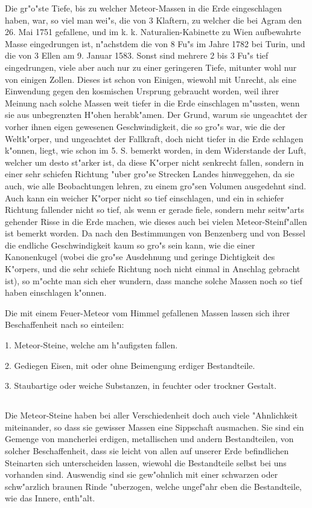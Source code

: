 \documentclass[a4paper, 11pt, oneside, polutonikogreek, german]{article}
\begin{document}
Die gr"o"ste Tiefe, bis zu welcher Meteor-Massen in die Erde eingeschlagen haben, war, so viel man wei"s, die von 3 Klaftern, zu welcher die bei Agram den 26. Mai 1751 gefallene, und im k. k. Naturalien-Kabinette zu Wien aufbewahrte Masse eingedrungen ist, n"achstdem die von 8 Fu"s im Jahre 1782 bei Turin, und die von 3 Ellen am 9. Januar 1583. Sonst sind mehrere 2 bis 3 Fu"s tief eingedrungen, viele aber auch nur zu einer geringeren Tiefe, mitunter wohl nur von einigen Zollen. Dieses ist schon von Einigen, wiewohl mit Unrecht, als eine Einwendung gegen den kosmischen Ursprung gebraucht worden, weil ihrer Meinung nach solche Massen weit tiefer in die Erde einschlagen m"ussten, wenn sie aus unbegrenzten H"ohen herabk"amen. Der Grund, warum sie ungeachtet der vorher ihnen eigen gewesenen Geschwindigkeit, die so gro"s war, wie die der Weltk"orper, und ungeachtet der Fallkraft, doch nicht tiefer in die Erde schlagen k"onnen, liegt, wie schon im 5. S. bemerkt worden, in dem Widerstande der Luft, welcher um desto st"arker ist, da diese K"orper nicht senkrecht fallen, sondern in einer sehr schiefen Richtung "uber gro"se Strecken Landes hinweggehen, da sie auch, wie alle Beobachtungen lehren, zu einem gro"sen Volumen ausgedehnt sind. Auch kann ein weicher K"orper nicht so tief einschlagen, und ein in schiefer Richtung fallender nicht so tief, als wenn er gerade fiele, sondern mehr seitw"arts gehender Risse in die Erde machen, wie dieses auch bei vielen Meteor-Steinf"allen ist bemerkt worden. Da nach den Bestimmungen von Benzenberg und von Bessel die endliche Geschwindigkeit kaum so gro"s sein kann, wie die einer Kanonenkugel (wobei die gro"se Ausdehnung und geringe Dichtigkeit des K"orpers, und die sehr schiefe Richtung noch nicht einmal in Anschlag gebracht ist), so m"ochte man sich eher wundern, dass manche solche Massen noch so tief haben einschlagen k"onnen.

Die mit einem Feuer-Meteor vom Himmel gefallenen Massen lassen sich ihrer Beschaffenheit nach so einteilen:

1. Meteor-Steine, welche am h"aufigsten fallen.

2. Gediegen Eisen, mit oder ohne Beimengung erdiger Bestandteile.

3. Staubartige oder weiche Substanzen, in feuchter oder trockner Gestalt.
\subsection{}
\paragraph{}
Die Meteor-Steine haben bei aller Verschiedenheit doch auch viele "Ahnlichkeit miteinander, so dass sie gewisser Massen eine Sippschaft ausmachen. Sie sind ein Gemenge von mancherlei erdigen, metallischen und andern Bestandteilen, von solcher Beschaffenheit, dass sie leicht von allen auf unserer Erde befindlichen Steinarten sich unterscheiden lassen, wiewohl die Bestandteile selbst bei uns vorhanden sind. Auswendig sind sie gew"ohnlich mit einer schwarzen oder schw"arzlich braunen Rinde "uberzogen, welche ungef"ahr eben die Bestandteile, wie das Innere, enth"alt.
\end{document}

